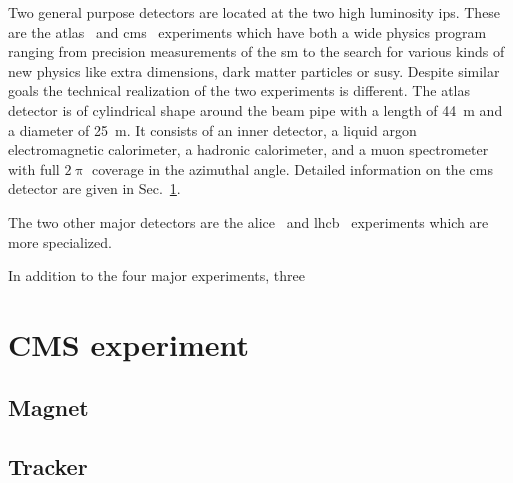 Two general purpose detectors are located at the two high luminosity \glspl{ip}. These are the \gls{atlas}~\cite{Aad:2008zzm} and \gls{cms}~\cite{Chatrchyan:2008aa} experiments which have both a wide physics program ranging from precision measurements of the \gls{sm} to the search for various kinds of new physics like extra dimensions, dark matter particles or \gls{susy}. Despite similar goals the technical realization of the two experiments is different. The \gls{atlas} detector is of cylindrical shape around the beam pipe with a length of 44~m and a diameter of 25~m. It consists of an inner detector, a liquid argon electromagnetic calorimeter, a hadronic calorimeter, and a muon spectrometer with full $2\uppi$ coverage in the azimuthal angle. %
Detailed information on the \gls{cms} detector are given in Sec.~\ref{sec:experiment-cms}.

The two other major detectors are the \gls{alice}~\cite{Aamodt:2008zz} and \gls{lhcb}~\cite{Alves:2008zz} experiments which are more specialized. 

In addition to the four major experiments, three 

\section{CMS experiment}
\label{sec:experiment-cms}


\subsection{Magnet}

\cite{Acquistapace:1997fm}

\subsection{Tracker}



